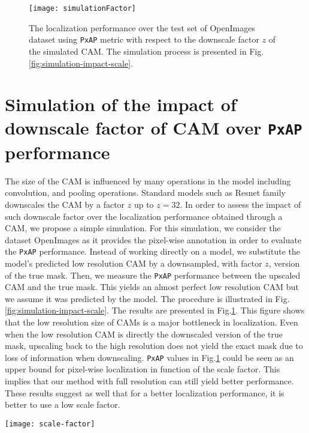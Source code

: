\documentclass[twocolumn]{article}
\newcommand\pxap{\texttt{PxAP}\xspace}
\theoremstyle{definition}
\begin{document}
\begin{figure}[ht!]
\centering
  \centering
  \texttt{[image: simulationFactor]}
  \caption{The localization performance over the test set of OpenImages dataset using \pxap metric with respect to the downscale factor $z$ of the simulated CAM. The simulation process is presented in Fig.\ref{fig:simulation-impact-scale}.}
  \label{fig:impact-scale}
\end{figure}




\section{Simulation of the impact of downscale factor of CAM over \pxap performance}
\label{sec:sim-impact-factor}
The size of the CAM is influenced by many operations in the model including convolution, and pooling operations. Standard models such as Resnet family~\cite{heZRS16} downscales the CAM by a factor ${z}$ up to ${z=32}$. In order to assess the impact of such downscale factor over the localization performance obtained through a CAM, we propose a simple simulation. For this simulation, we consider the dataset OpenImages as it provides the pixel-wise annotation in order to evaluate the \pxap performance. Instead of working directly on a model, we substitute the model's predicted low resolution CAM by a downsampled, with factor $z$, version of the true mask. Then, we measure the \pxap performance between the upscaled CAM and the true mask. This yields an almost perfect low resolution CAM but we assume it was predicted by the model. The procedure is illustrated in Fig.\ref{fig:simulation-impact-scale}. The results are presented in Fig.\ref{fig:impact-scale}. This figure shows that the low resolution size of CAMs is a major bottleneck in localization. Even when the low resolution CAM is directly the downscaled version of the true mask, upscaling back to the high resolution does not yield the exact mask due to loss of information when downscaling. \pxap values in Fig.\ref{fig:impact-scale} could be seen as an upper bound for pixel-wise localization in function of the scale factor. This implies that our method with full resolution can still yield better performance. These results suggest as well that for a better localization performance, it is better to use a low scale factor.

\begin{figure*}[ht!]
\centering
  \centering
  \texttt{[image: scale-factor]}
  \caption{Simulation to evaluate the impact of CAM size over the localization performance using \pxap metric. In our simulation, we substitute the low resolution CAM predicted by the model by downscaled version of the true mask by a factor $z$ allowing us to quickly change the scale and assess its impact on the localization performance using \pxap metric. The scaling procedure is performed using bilinear interpolation.}
  \label{fig:simulation-impact-scale}
\end{figure*}
\end{document}
